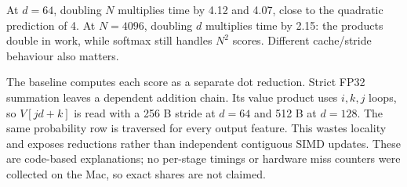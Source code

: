 \documentclass[10pt,a4paper]{article}
\begin{document}
At $d=64$, doubling $N$ multiplies time by 4.12 and 4.07, close to the quadratic
prediction of 4. At $N=4096$, doubling $d$ multiplies time by 2.15: the products double
in work, while softmax still handles $N^2$ scores. Different cache/stride behaviour also matters.

The baseline computes each score as a separate dot reduction. Strict FP32 summation leaves
a dependent addition chain. Its value product uses $i,k,j$ loops, so $V[jd+k]$ is read with
a 256 B stride at $d=64$ and 512 B at $d=128$. The same probability row is traversed for
every output feature. This wastes locality and exposes reductions rather than independent
contiguous SIMD updates. These are code-based explanations; no per-stage timings or hardware
miss counters were collected on the Mac, so exact shares are not claimed.
\end{document}
